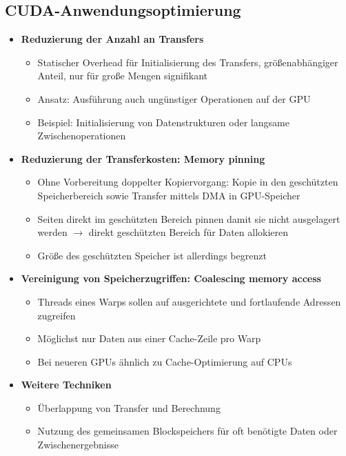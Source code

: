 \subsection{CUDA-Anwendungsoptimierung}
\begin{itemize}
	\item \textbf{Reduzierung der Anzahl an Transfers}
	\begin{itemize}
		\item Statischer Overhead für Initialisierung des Transfers, größenabhängiger Anteil, nur für große Mengen signifikant
		\item Ansatz: Ausführung auch ungünstiger Operationen auf der GPU
		\item Beispiel: Initialisierung von Datenstrukturen oder langsame Zwischenoperationen
	\end{itemize}
	\item \textbf{Reduzierung der Transferkosten: Memory pinning}
	\begin{itemize}
		\item Ohne Vorbereitung doppelter Kopiervorgang: Kopie in den geschützten Speicherbereich sowie Transfer mittels DMA in GPU-Speicher
		\item Seiten direkt im geschützten Bereich pinnen damit sie nicht ausgelagert werden \(\rightarrow\) direkt geschützten Bereich für Daten allokieren
		\item Größe des geschützten Speicher ist allerdings begrenzt
	\end{itemize}
	\item \textbf{Vereinigung von Speicherzugriffen: Coalescing memory access}
	\begin{itemize}
		\item Threads eines Warps sollen auf ausgerichtete und fortlaufende Adressen zugreifen
		\item Möglichst nur Daten aus einer Cache-Zeile pro Warp
		\item Bei neueren GPUs ähnlich zu Cache-Optimierung auf CPUs
	\end{itemize}
	\item \textbf{Weitere Techniken}
	\begin{itemize}
		\item Überlappung von Transfer und Berechnung
		\item Nutzung des gemeinsamen Blockspeichers für oft benötigte Daten oder Zwischenergebnisse
	\end{itemize}
\end{itemize}



